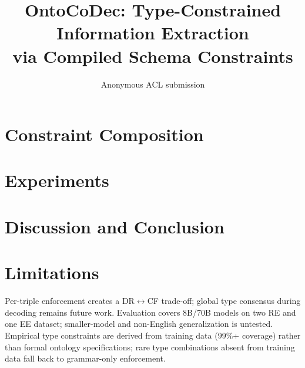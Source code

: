 \documentclass[11pt]{article}
\title{OntoCoDec: Type-Constrained Information Extraction\\via Compiled Schema Constraints}
\author{Anonymous ACL submission}
\begin{document}
\maketitle









\section{Constraint Composition}
\label{sec:composition}


\section{Experiments}
\label{sec:experiments}








\section{Discussion and Conclusion}
\label{sec:discussion}


\section*{Limitations}

Per-triple enforcement creates a DR$\leftrightarrow$CF trade-off; global type consensus during decoding remains future work.
Evaluation covers 8B/70B models on two RE and one EE dataset; smaller-model and non-English generalization is untested.
Empirical type constraints are derived from training data (99\%+ coverage) rather than formal ontology specifications; rare type combinations absent from training data fall back to grammar-only enforcement.



\appendix
\end{document}
